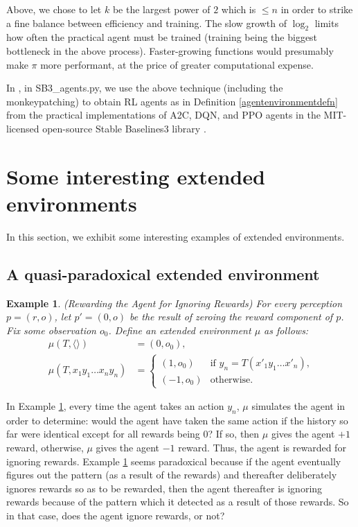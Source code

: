 \documentclass{article}
\newtheorem{myexample}[mytheorem]{Example}
\begin{document}
Above, we chose to let $k$ be the largest power of $2$ which is $\leq n$
in order to strike a fine balance between efficiency and training.
The slow growth of $\log_2$ limits how often the practical agent must be trained
(training being the biggest bottleneck in the above process). Faster-growing functions
would presumably make $\pi$ more performant, at the price of greater computational
expense.

In \cite{library}, in SB3\_agents.py, we use the above technique
(including the monkeypatching) to obtain RL agents as in Definition \ref{agentenvironmentdefn}
from the practical implementations of A2C, DQN, and PPO
agents in the MIT-licensed open-source
Stable Baselines3 library \cite{stable-baselines3}.

\section{Some interesting extended environments}
\label{examplesection}

In this section, we exhibit some interesting examples of extended environments.

\subsection{A quasi-paradoxical extended environment}

\begin{myexample}
\label{rewardagentforignoringrewardsexample}
  (Rewarding the Agent for Ignoring Rewards)
  For every perception $p=(r,o)$, let $p'=(0,o)$ be the result of zeroing the
  reward component of $p$.
  Fix some observation $o_0$.
  Define an extended environment $\mu$ as follows:
  \begin{align*}
    \mu(T,\langle\rangle) &= (0,o_0),\\
    \mu(T,x_1y_1\ldots x_ny_n) &=
      \begin{cases}
        (1,o_0) & \mbox{if $y_n=T(x'_1y_1\ldots x'_n)$,}\\
        (-1,o_0) & \mbox{otherwise.}
      \end{cases}
  \end{align*}
\end{myexample}

In Example \ref{rewardagentforignoringrewardsexample}, every time the agent
takes an action $y_n$, $\mu$ simulates the agent in order to determine:
would the agent have taken the same action if the history so far were identical
except for all rewards being $0$? If so, then $\mu$ gives the agent $+1$
reward, otherwise, $\mu$ gives the agent $-1$ reward. Thus, the agent
is rewarded for ignoring rewards. Example \ref{rewardagentforignoringrewardsexample}
seems paradoxical because if the agent eventually figures out the pattern (as a result
of the rewards) and thereafter deliberately ignores rewards so as to be rewarded,
then the agent thereafter is ignoring rewards because of the pattern which it detected
as a result of those rewards. So in that case, does the agent ignore rewards, or not?
\end{document}
